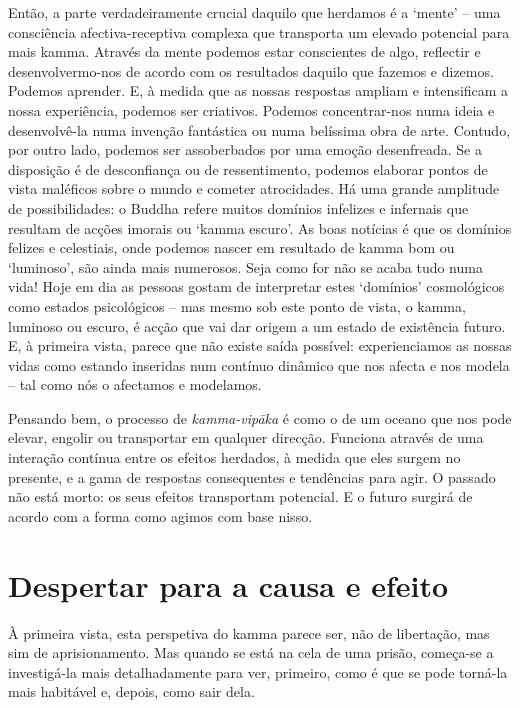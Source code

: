 Então, a parte verdadeiramente crucial daquilo que herdamos é a `mente' -- uma
consciência afectiva-receptiva complexa que transporta um elevado potencial para
mais kamma. Através da mente podemos estar conscientes de algo, reflectir e
desenvolvermo-nos de acordo com os resultados daquilo que fazemos e dizemos.
Podemos aprender. E, à medida que as nossas respostas ampliam e intensificam a
nossa experiência, podemos ser criativos. Podemos concentrar-nos numa ideia e
desenvolvê-la numa invenção fantástica ou numa belíssima obra de arte. Contudo,
por outro lado, podemos ser assoberbados por uma emoção desenfreada. Se a
disposição é de desconfiança ou de ressentimento, podemos elaborar pontos de
vista maléficos sobre o mundo e cometer atrocidades. Há uma grande amplitude de
possibilidades: o Buddha refere muitos domínios infelizes e infernais que
resultam de acções imorais ou `kamma escuro'. As boas notícias é que os domínios
felizes e celestiais, onde podemos nascer em resultado de kamma bom ou
`luminoso', são ainda mais numerosos.
Seja como for não se acaba tudo
numa vida! Hoje em dia as pessoas gostam de interpretar estes `domínios'
cosmológicos como estados psicológicos -- mas mesmo sob este ponto de vista, o
kamma, luminoso ou escuro, é acção que vai dar origem a um estado de existência
futuro. E, à primeira vista, parece que não existe saída possível:
experienciamos as nossas vidas como estando inseridas num contínuo dinâmico que
nos afecta e nos modela -- tal como nós o afectamos e modelamos.

Pensando bem, o processo de \emph{kamma-vipāka} é como o de um oceano que nos
pode elevar, engolir ou transportar em qualquer direcção. Funciona através de
uma interação contínua entre os efeitos herdados, à medida que eles surgem no
presente, e a gama de respostas consequentes e tendências para agir. O passado
não está morto: os seus efeitos transportam potencial. E o futuro surgirá de
acordo com a forma como agimos com base nisso.

\section{Despertar para a causa e efeito}

À primeira vista, esta perspetiva do kamma parece ser, não de libertação, mas
sim de aprisionamento. Mas quando se está na cela de uma prisão, começa-se a
investigá-la mais detalhadamente para ver, primeiro, como é que se pode torná-la
mais habitável e, depois, como sair dela.

